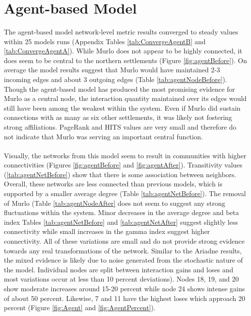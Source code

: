 \documentclass[12pt,a4paper]{thesis}
\begin{document}
\section{Agent-based Model}

\paragraph{}
The agent-based model network-level metric results converged to steady values within 25 models runs (Appendix Tables \ref{tab:ConvergeAgentB} and \ref{tab:ConvergeAgentA}). While Murlo does not appear to be highly connected, it does seem to be central to the northern settlements (Figure \ref{fig:agentBefore}). On average the model results suggest that Murlo would have maintained 2-3 incoming edges and about 3 outgoing edges (Table \ref{tab:agentNodeBefore}). Though the agent-based model has produced the most promising evidence for Murlo as a central node, the interaction quantity maintained over its edges would still have been among the weakest within the system. Even if Murlo did sustain connections with as many as six other settlements, it was likely not fostering strong affiliations. PageRank and HITS values are very small and therefore do not indicate that Murlo was serving an important central function.

\paragraph{}
Visually, the networks from this model seem to result in communities with higher connectivities (Figures \ref{fig:agentBefore} and \ref{fig:agentAfter}). Transitivity values (\ref{tab:agentNetBefore}) show that there is some association between neighbors. Overall, these networks are less connected than previous models, which is supported by a smaller average degree (Table \ref{tab:agentNetBefore}). The removal of Murlo (Table \ref{tab:agentNodeAfter} does not seem to suggest any strong fluctuations within the system. Minor decreases in the average degree and beta index Tables \ref{tab:agentNetBefore} and \ref{tab:agentNetAfter} suggest slightly less connectivity while small increases in the gamma index suggest higher connectivity. All of these variations are small and do not provide strong evidence towards any real transformations of the network. Similar to the Ariadne results, the mixed evidence is likely due to noise generated from the stochastic nature of the model. Individual nodes are split between interaction gains and loses and most variations occur at less than 10 percent deviations). Nodes 18, 19, and 20 show moderate increases around 15-20 percent while node 24 shows intense gains of about 50 percent. Likewise, 7 and 11 have the highest loses which approach 20 percent (Figure \ref{fig:Agent} and \ref{fig:AgentPercent}). 
\end{document}
